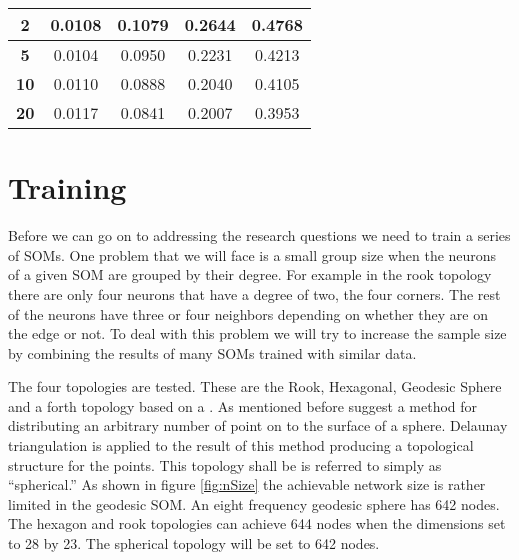 \begin{table}
{\begin{tabular}{|c||c|c|c|c|}
  \hline
  \textbf{2} & 0.0108& 0.1079& 0.2644& 0.4768 \\
  \hline
  \textbf{5} & 0.0104& 0.0950& 0.2231& 0.4213 \\
  \hline
  \textbf{10} & 0.0110& 0.0888& 0.2040& 0.4105 \\
  \hline
  \textbf{20} & 0.0117& 0.0841& 0.2007& 0.3953 \\
  \hline
  \end{tabular} 
  \label{ivtable1:graph}
} 
\end{table}

\section{Training}
Before we can go on to addressing the research questions we need to train a
series of SOMs. One problem that we will face is a small group size when the
neurons of a given SOM are grouped by their degree.  For example in the rook
topology there are only four neurons that have a degree of two, the four
corners. The rest of the neurons have three or four neighbors depending on
whether they are on the edge or not. To deal with this problem we will try to
increase the sample size by combining the results of many SOMs trained with
similar data.

The four topologies are tested. These are the Rook, Hexagonal, Geodesic Sphere
and a forth topology based on a \cite{Rakhmanov94}. As mentioned before
\cite{Rakhmanov94} suggest a method for distributing an arbitrary number of
point on to the surface of a sphere.  Delaunay triangulation is applied to the
result of this method producing a topological structure for the points.  This
topology shall be is referred to simply as ``spherical.''  As shown in figure
\ref{fig:nSize} the achievable network size is rather limited in the geodesic
SOM.  An eight frequency geodesic sphere has 642 nodes. The hexagon and rook
topologies can achieve 644 nodes when the dimensions set to 28 by 23. The
spherical topology will be set to 642 nodes.

